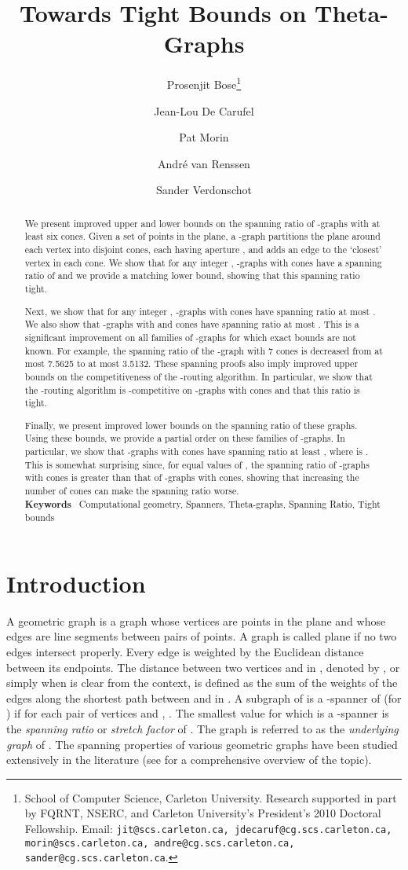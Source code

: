 \documentclass[12pt]{article}
\title{Towards Tight Bounds on Theta-Graphs}
\author{
Prosenjit Bose\thanks{School of Computer Science, Carleton University. Research supported in part by FQRNT, NSERC, and Carleton University's President's 2010 Doctoral Fellowship. Email: \texttt{jit@scs.carleton.ca, jdecaruf@cg.scs.carleton.ca, morin@scs.carleton.ca, andre@cg.scs.carleton.ca, sander@cg.scs.carleton.ca}.}
\and
\addtocounter{footnote}{-1}
Jean-Lou De Carufel\footnotemark
\and 
\addtocounter{footnote}{-1}
Pat Morin\footnotemark
\and 
\addtocounter{footnote}{-1}
Andr\'e van Renssen\footnotemark
\and
\addtocounter{footnote}{-1}
Sander Verdonschot\footnotemark
}
\date{}
\newcommand{\keywords}[1]{\noindent\textbf{Keywords}~ #1}
\begin{document}
\maketitle

\begin{abstract}
  We present improved upper and lower bounds on the spanning ratio of -graphs with at least six cones. Given a set of points in the plane, a -graph partitions the plane around each vertex into  disjoint cones, each having aperture , and adds an edge to the `closest' vertex in each cone. We show that for any integer , -graphs with  cones have a spanning ratio of  and we provide a matching lower bound, showing that this spanning ratio tight. 

  Next, we show that for any integer , -graphs with  cones have spanning ratio at most . We also show that -graphs with  and  cones have spanning ratio at most . This is a significant improvement on all families of -graphs for which exact bounds are not known. For example, the spanning ratio of the -graph with 7 cones is decreased from at most 7.5625 to at most 3.5132. These spanning proofs also imply improved upper bounds on the competitiveness of the -routing algorithm. In particular, we show that the -routing algorithm is -competitive on -graphs with  cones and that this ratio is tight.  

  Finally, we present improved lower bounds on the spanning ratio of these graphs. Using these bounds, we provide a partial order on these families of -graphs. In particular, we show that -graphs with  cones have spanning ratio at least , where  is . This is somewhat surprising since, for equal values of , the spanning ratio of -graphs with  cones is greater than that of -graphs with  cones, showing that increasing the number of cones can make the spanning ratio worse. \\

  \keywords{Computational geometry, Spanners, Theta-graphs, Spanning Ratio, Tight bounds}
\end{abstract}


\section{Introduction}
A geometric graph  is a graph whose vertices are points in the plane and whose edges are line segments between pairs of points. A graph  is called plane if no two edges intersect properly. Every edge is weighted by the Euclidean distance between its endpoints. The distance between two vertices  and  in , denoted by , or simply  when  is clear from the context, is defined as the sum of the weights of the edges along the shortest path between  and  in . A subgraph  of  is a -spanner of  (for ) if for each pair of vertices  and , . The smallest value  for which  is a -spanner is the \emph{spanning ratio} or \emph{stretch factor} of . The graph  is referred to as the {\em underlying graph} of . The spanning properties of various geometric graphs have been studied extensively in the literature (see \cite{BS11,NS-GSN-06} for a comprehensive overview of the topic). 
\end{document}
